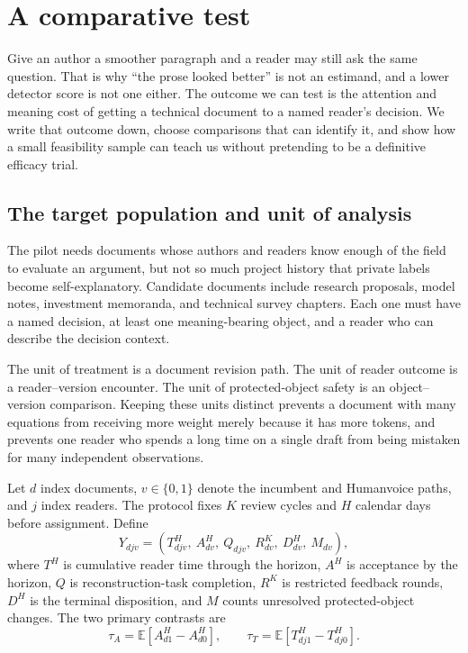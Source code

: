\chapter{A comparative test}
\label{ch:evaluation-detail}

Give an author a smoother paragraph and a reader may still ask the same
question. That is why ``the prose looked better'' is not an estimand, and a
lower detector score is not one either. The outcome we can test is the
attention and meaning cost of getting a technical document to a named reader's
decision. We write that outcome down, choose comparisons that can identify it,
and show how a small feasibility sample can teach us without
pretending to be a definitive efficacy trial.

\section{The target population and unit of analysis}
\label{sec:eval-population}

The pilot needs documents whose authors and readers know enough of the field to
evaluate an argument, but not so much project history that private labels become
self-explanatory. Candidate documents include research proposals, model notes,
investment memoranda, and technical survey chapters. Each one must have a named
decision, at least one meaning-bearing object, and a reader who can describe the
decision context.

The unit of treatment is a document revision path. The unit of reader outcome
is a reader--version encounter. The unit of protected-object safety is an
object--version comparison. Keeping these units distinct prevents a document
with many equations from receiving more weight merely because it has more
tokens, and prevents one reader who spends a long time on a single draft from
being mistaken for many independent observations.

Let $d$ index documents, $v\in\{0,1\}$ denote the incumbent and Humanvoice
paths, and $j$ index readers. The protocol fixes $K$ review cycles and $H$
calendar days before assignment. Define
\begin{equation}
  Y_{djv} = \left(T^H_{djv},\ A^H_{dv},\ Q_{djv},\ R^K_{dv},\
  D^H_{dv},\ M_{dv}\right),
  \label{eq:eval-outcome-vector}
\end{equation}
where $T^H$ is cumulative reader time through the horizon, $A^H$ is acceptance
by the horizon, $Q$ is reconstruction-task completion, $R^K$ is restricted
feedback rounds, $D^H$ is the terminal disposition, and $M$ counts unresolved
protected-object changes. The two primary contrasts are
\begin{equation}
  \tau_A=\mathbb E[A^H_{d1}-A^H_{d0}],
  \qquad
  \tau_T=\mathbb E[T^H_{dj1}-T^H_{dj0}].
  \label{eq:eval-primary-estimand}
\end{equation}

